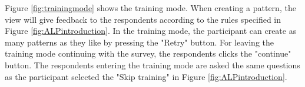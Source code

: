     Figure \ref{fig:trainingmode} shows the training mode. When creating a pattern, the view will give feedback to the respondents according to the rules specified in Figure \ref{fig:ALPintroduction}. In the training mode, the participant can create as many patterns as they like by pressing the "Retry" button. For leaving the training mode continuing with the survey,  the respondents clicks the "continue" button. The respondents entering the training mode are asked the same questions as the participant selected the "Skip training" in Figure \ref{fig:ALPintroduction}.

      \begin{figure}[H]
        \centering
\end{figure}
